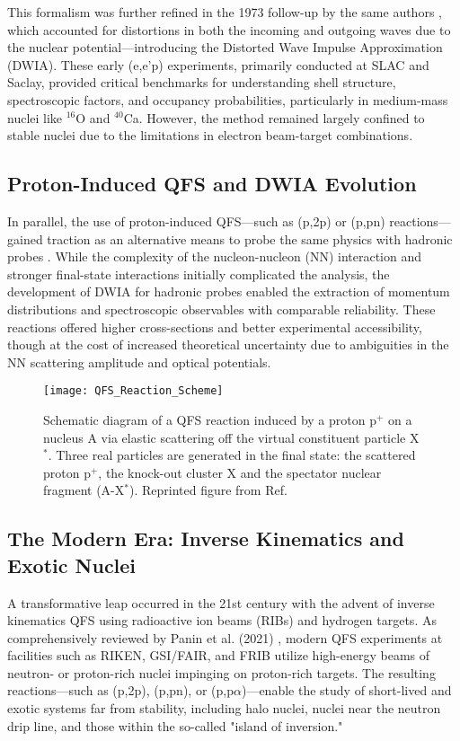 This formalism was further refined in the 1973 follow-up by the same authors \cite{jacob_quasi-free_1973}, which accounted for distortions in both the incoming and outgoing waves due to the nuclear potential—introducing the Distorted Wave Impulse Approximation (DWIA). These early (e,e'p) experiments, primarily conducted at SLAC and Saclay, provided critical benchmarks for understanding shell structure, spectroscopic factors, and occupancy probabilities, particularly in medium-mass nuclei like $^{16}$O and $^{40}$Ca. However, the method remained largely confined to stable nuclei due to the limitations in electron beam-target combinations.


\subsection{Proton-Induced QFS and DWIA Evolution}

In parallel, the use of proton-induced \gls{QFS}—such as (p,2p) or (p,pn) reactions—gained traction as an alternative means to probe the same physics with hadronic probes \cite{aumann_quasifree_2013}. While the complexity of the nucleon-nucleon (NN) interaction and stronger final-state interactions initially complicated the analysis, the development of DWIA for hadronic probes enabled the extraction of momentum distributions and spectroscopic observables with comparable reliability. These reactions offered higher cross-sections and better experimental accessibility, though at the cost of increased theoretical uncertainty due to ambiguities in the NN scattering amplitude and optical potentials.

\begin{figure}
	\texttt{[image: QFS\_Reaction\_Scheme]}
	\caption{Schematic diagram of a QFS reaction induced by a proton p$^+$ on a nucleus A via elastic scattering off the virtual constituent particle X$^*$. Three real particles are generated in the final state: the scattered proton p$^+$, the knock-out cluster X and the spectator nuclear fragment (A-X$^*$). Reprinted figure from Ref. \cite{panin_quasi-free_2021}}
	\label{fig:QFS_Scheme}
\end{figure}

\subsection{The Modern Era: Inverse Kinematics and Exotic Nuclei}

A transformative leap occurred in the 21st century with the advent of inverse kinematics \gls{QFS} using radioactive ion beams (RIBs) and hydrogen targets. As comprehensively reviewed by Panin et al. (2021) \cite{panin_quasi-free_2021}, modern \gls{QFS} experiments at facilities such as RIKEN, GSI/FAIR, and FRIB utilize high-energy beams of neutron- or proton-rich nuclei impinging on proton-rich targets. The resulting reactions—such as (p,2p), (p,pn), or (p,p$\alpha$)—enable the study of short-lived and exotic systems far from stability, including halo nuclei, nuclei near the neutron drip line, and those within the so-called "island of inversion."

